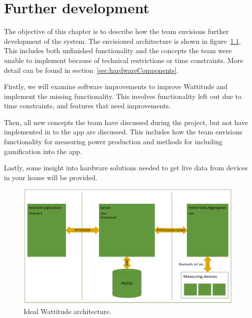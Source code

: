 \chapter{Further development}
\label{sec:further}
The objective of this chapter is to describe how the team envisions further development of the system. The envisioned architecture is shown in figure~\ref{fig:idealArchitecture}. This includes both unfinished functionality and the concepts the team were unable to implement because of technical restrictions or time constraints. More detail can be found in section~\ref{sec:hardwareComponents}.

Firstly, we will examine software improvements to improve Wattitude and implement the missing functionality. This involves functionality left out due to time constraints, and features that need improvements. 

Then, all new concepts the team have discussed during the project, but not have implemented in to the app are discussed. This includes how the team envisions functionality for measuring power production and methods for including gamification into the app. 

Lastly, some insight into hardware solutions needed to get live data from devices in your house will be provided. 

\begin{figure}[H]
\centering
\includegraphics[height=0.3\textheight]{ch/further/fig/architecture.png}
\caption{Ideal Wattitude architecture.}
\label{fig:idealArchitecture}
\end{figure}




